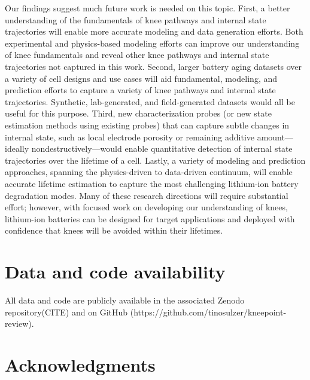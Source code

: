 \documentclass[journal=jpclcd,manuscript=article]{achemso}
\newcommand{\pbox}[1]{{
\fbox{
\parbox{0.8\textwidth}{  \fbox{$\triangleright$\textcolor{blue}{\textbf{Peter}:}} 
#1
}}}}
\begin{document}
Our findings suggest much future work is needed on this topic.
First, a better understanding of the fundamentals of knee pathways and internal state trajectories will enable more accurate modeling and data generation efforts. Both experimental and physics-based modeling efforts can improve our understanding of knee fundamentals and reveal other knee pathways and internal state trajectories not captured in this work.
Second, larger battery aging datasets over a variety of cell designs and use cases will aid fundamental, modeling, and prediction efforts to capture a variety of knee pathways and internal state trajectories. Synthetic, lab-generated, and field-generated datasets would all be useful for this purpose.
Third, new characterization probes (or new state estimation methods using existing probes) that can capture subtle changes in internal state, such as local electrode porosity or remaining additive amount---ideally nondestructively---would enable quantitative detection of internal state trajectories over the lifetime of a cell.
Lastly, a variety of modeling and prediction approaches, spanning the physics-driven to data-driven continuum, will enable accurate lifetime estimation to capture the most challenging lithium-ion battery degradation modes.
Many of these research directions will require substantial effort; however, with focused work on developing our understanding of knees, lithium-ion batteries can be designed for target applications and deployed with confidence that knees will be avoided within their lifetimes. 


\section{Data and code availability}

All data and code are publicly available in the associated Zenodo repository(CITE) and on GitHub (https://github.com/tinosulzer/kneepoint-review).

\section{Acknowledgments}
\end{document}
